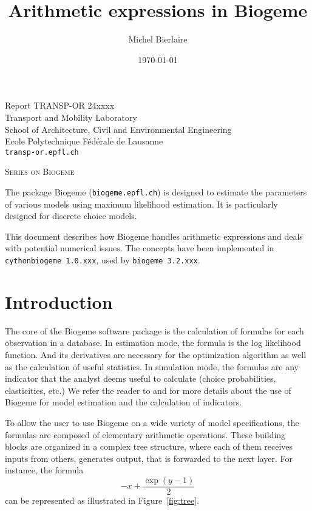 \documentclass[12pt,a4paper]{article}
\title{Arithmetic expressions in Biogeme}
\author{Michel Bierlaire}
\date{\today}
\begin{document}
\begin{titlepage}
  \pagestyle{empty}

  \maketitle
  \vspace{2cm}

  \begin{center}
    \small Report TRANSP-OR 24xxxx \\ Transport and Mobility Laboratory \\ School of Architecture, Civil and Environmental Engineering \\ Ecole Polytechnique F\'ed\'erale de Lausanne \\ \verb+transp-or.epfl.ch+
    \begin{center}
      \textsc{Series on Biogeme}
    \end{center}
  \end{center}


  \clearpage
\end{titlepage}


The package Biogeme (\texttt{biogeme.epfl.ch}) is designed to estimate
the parameters of various models using maximum likelihood
estimation. It is particularly designed for discrete choice
models.

This document describes how Biogeme handles arithmetic expressions and
deals with potential numerical issues. The concepts have been
implemented in  \lstinline+cythonbiogeme 1.0.xxx+, used by
\lstinline+biogeme 3.2.xxx+.


\section{Introduction}\label{eq:intro}

The core of the Biogeme software package is the calculation of
formulas for each observation in a database. In estimation mode, the
formula is the log likelihood function. And its derivatives are
necessary for the optimization algorithm as well as the calculation of
useful statistics.  In simulation mode, the formulas are any indicator
that the analyst deems useful to calculate (choice probabilities,
elasticities, etc.) We refer the reader to  and
 for more details about the use of Biogeme for
model estimation and the calculation of indicators.


To allow the user to use Biogeme on a wide variety of model
specifications, the formulas are composed of elementary arithmetic
operations. These building blocks are organized in a complex tree structure, where each of them receives inputs from others, generates output, that is forwarded to the next layer.
For instance, the formula
\[
-x + \frac{\exp(y - 1)}{2}
\]
can be represented as illustrated in Figure~\ref{fig:tree}.
\end{document}
